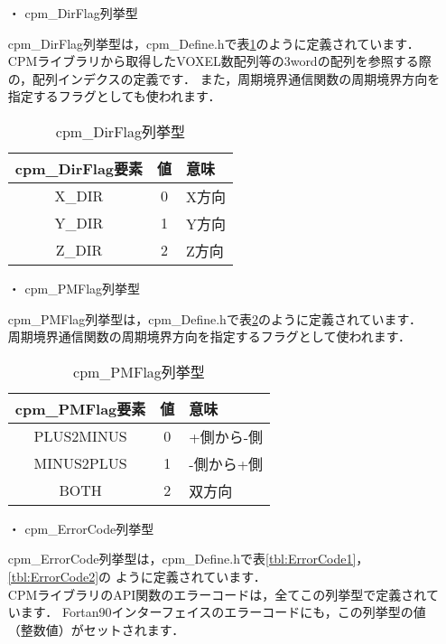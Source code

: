 \begin{itemize}
\item[・] {cpm\_DirFlag列挙型}

cpm\_DirFlag列挙型は，cpm\_Define.hで表\ref{tbl:DirFlag}のように定義されています．\\
CPMライブラリから取得したVOXEL数配列等の3wordの配列を参照する際の，配列インデクスの定義です．
また，周期境界通信関数の周期境界方向を指定するフラグとしても使われます．\\

\begin{table}[htb]
\begin{center}
\caption{cpm\_DirFlag列挙型}
\label{tbl:DirFlag}
\begin{tabular}{|c|c|l|}
\hline 
cpm\_DirFlag要素 & 値 & 意味\\
\hline
X\_DIR & 0 & X方向\\
Y\_DIR & 1 & Y方向\\
Z\_DIR & 2 & Z方向\\
\hline
\end{tabular}
\end{center}
\end{table}


\item[・] {cpm\_PMFlag列挙型}

cpm\_PMFlag列挙型は，cpm\_Define.hで表\ref{tbl:PMFlag}のように定義されています．\\
周期境界通信関数の周期境界方向を指定するフラグとして使われます．\\

\begin{table}[htb]
\begin{center}
\caption{cpm\_PMFlag列挙型}
\label{tbl:PMFlag}
\begin{tabular}{|c|c|l|}
\hline 
cpm\_PMFlag要素 & 値 & 意味\\
\hline
PLUS2MINUS & 0 & +側から-側\\
MINUS2PLUS & 1 & -側から+側\\
BOTH       & 2 & 双方向\\
\hline
\end{tabular}
\end{center}
\end{table}


\item[・] {cpm\_ErrorCode列挙型}

cpm\_ErrorCode列挙型は，cpm\_Define.hで表\ref{tbl:ErrorCode1}，\ref{tbl:ErrorCode2}の
ように定義されています．\\
CPMライブラリのAPI関数のエラーコードは，全てこの列挙型で定義されています．
Fortan90インターフェイスのエラーコードにも，この列挙型の値（整数値）がセットされます．\\


\end{itemize}
